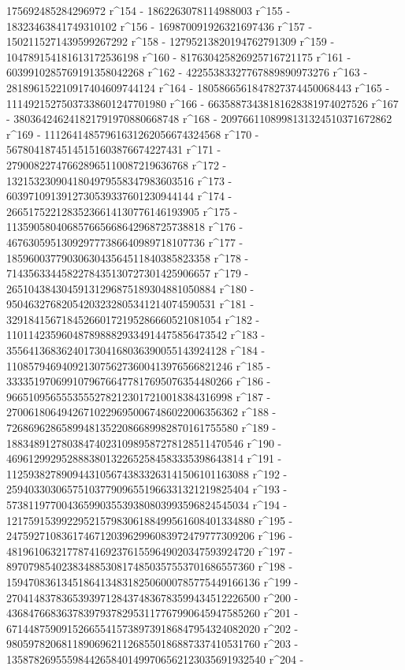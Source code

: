        175692485284296972 r^154 - 1862263078114988003 r^155 - 
       18323463841749310102 r^156 - 169870091926321697436 r^157 - 
       1502115271439599267292 r^158 - 12795213820194762791309 r^159 - 
       104789154181613172536198 r^160 - 
       817630425826925716721175 r^161 - 
       6039910285769191358042268 r^162 - 
       42255383327767889890973276 r^163 - 
       281896152210917404609744124 r^164 - 
       1805866561847827374450068443 r^165 - 
       11149215275037338601247701980 r^166 - 
       66358873438181628381974027526 r^167 - 
       380364246241821791970880668748 r^168 - 
       2097661108998131324510371672862 r^169 - 
       11126414857961631262056674324568 r^170 - 
       56780418745145151603876674227431 r^171 - 
       279008227476628965110087219636768 r^172 - 
       1321532309041804979558347983603516 r^173 - 
       6039710913912730539337601230944144 r^174 - 
       26651752212835236614130776146193905 r^175 - 
       113590580406857665668642968725738818 r^176 - 
       467630595130929777386640989718107736 r^177 - 
       1859600377903063043564511840385823358 r^178 - 
       7143563344582278435130727301425906657 r^179 - 
       26510438430459131296875189304881050884 r^180 - 
       95046327682054203232805341214074590531 r^181 - 
       329184156718452660172195286660521081054 r^182 - 
       1101142359604878988829334914475856473542 r^183 - 
       3556413683624017304168036390055143924128 r^184 - 
       11085794694092130756273600413976566821246 r^185 - 
       33335197069910796766477817695076354480266 r^186 - 
       96651095655535552782123017210018384316998 r^187 - 
       270061806494267102296950067486022006356362 r^188 - 
       726869628658994813522086689982870161755580 r^189 - 
       1883489127803847402310989587278128511470546 r^190 - 
       4696129929528883801322652584583335398643814 r^191 - 
       11259382789094431056743833263141506101163088 r^192 - 
       25940330306575103779096551966331321219825404 r^193 - 
       57381197700436599035539380803993596824545034 r^194 - 
       121759153992295215798306188499561608401334880 r^195 - 
       247592710836174671203962996083972479777309206 r^196 - 
       481961063217787416923761559649020347593924720 r^197 - 
       897079854023834885308174850357553701686557360 r^198 - 
       1594708361345186413483182506000785775449166136 r^199 - 
       2704148378365393971284374836783599434512226500 r^200 - 
       4368476683637839793782953117767990645947585260 r^201 - 
       6714487590915266554157389739186847954324082020 r^202 - 
       9805978206811890696211268550186887337410531760 r^203 - 
       13587826955598442658401499706562123035691932540 r^204 - 
